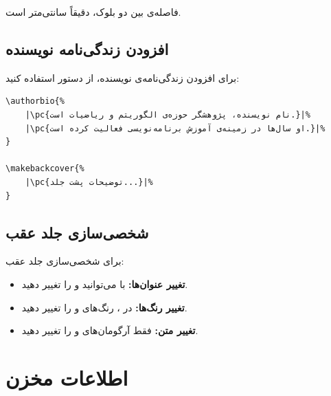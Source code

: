 فاصله‌ی بین دو بلوک، دقیقاً 
سانتی‌متر است.


\subsection{افزودن زندگی‌نامه نویسنده}
\label{sec:cover-back-authorbio}

برای افزودن زندگی‌نامه‌ی نویسنده، از دستور
 استفاده کنید:

\begin{latin}
\begin{verbatim}
\authorbio{%
    |\pc{نام نویسنده، پژوهشگر حوزه‌ی الگوریتم و ریاضیات است.}|%
    |\pc{او سال‌ها در زمینه‌ی آموزش برنامه‌نویسی فعالیت کرده است.}|%
}

\makebackcover{%
    |\pc{توضیحات پشت جلد...}|%
}
\end{verbatim}
\end{latin}


\subsection{شخصی‌سازی جلد عقب}
\label{sec:cover-back-custom}

برای شخصی‌سازی جلد عقب:

\begin{itemize}
    \item \textbf{تغییر عنوان‌ها:} با
     می‌توانید
     و
     را تغییر دهید.
    \item \textbf{تغییر رنگ‌ها:} در
    ، رنگ‌های
     و  را
    تغییر دهید.
    \item \textbf{تغییر متن:} فقط آرگومان‌های
     و  را
    تغییر دهید.
\end{itemize}


\section{اطلاعات مخزن}
\label{sec:cover-repository}

